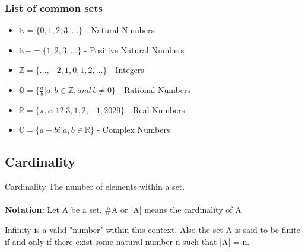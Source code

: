 \documentclass[../MATH-2000-Notes.tex]{subfiles}
\begin{document}
\subsubsection{List of common sets}
\begin{itemize}
    \item \(\mathbb{N} = \{0,1,2,3,\dots\}\) - Natural Numbers
    \item \(\mathbb{N}+ = \{1,2,3,\dots\}\) - Positive Natural Numbers
    \item \(\mathbb{Z} = \{\dots,-2,1,0,1,2,\dots\}\) - Integers
    \item \(\mathbb{Q} = \{\frac{a}{b}|a,b\in \mathbb{Z}, and\ b\neq 0\}\) - Rational Numbers
    \item \(\mathbb{R} = \{\pi, e, 12.3,1,2,-1,2029\}\) - Real Numbers
    \item \(\mathbb{C} = \{a + bi | a,b\in \mathbb{R}\}\) - Complex Numbers
\end{itemize}
\subsection{Cardinality}
\begin{Definition}
    {Cardinality}
    The number of elements within a set.
    \\~\\
    \textbf{Notation:} Let A be a set. \#A or |A| means the cardinality of A
\end{Definition}
\begin{Note}
    Infinity is a valid "number" within this context. Also the set A is said to be finite if and only if there exist some natural number n such that |A| = n.
\end{Note}
\end{document}
